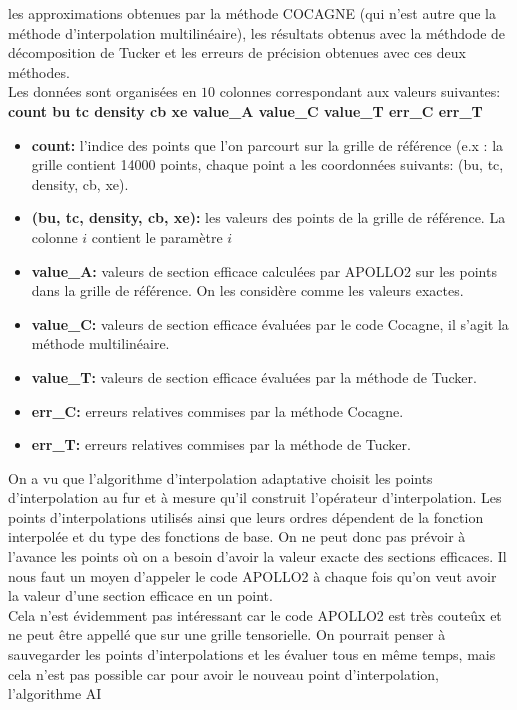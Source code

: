 les approximations obtenues par la méthode COCAGNE (qui n'est autre que la méthode d'interpolation multilinéaire), les résultats obtenus avec la méthdode de décomposition de Tucker et
les erreurs de précision obtenues avec ces deux méthodes.\\
Les données sont organisées en $10$ colonnes correspondant aux valeurs suivantes: \textbf{count bu tc density cb xe value\_A value\_C value\_T err\_C err\_T}
\begin{itemize}
\item \textbf{count:} l'indice des points que l'on parcourt sur la grille de référence (e.x : la grille contient 14000 points, chaque point a les coordonnées suivants: (bu, tc, density, cb, xe).
\item \textbf{(bu, tc, density, cb, xe):} les valeurs des points de la grille de référence. La colonne $i$ contient le paramètre $i$
\item \textbf{value\_A:} valeurs de section efficace calculées par APOLLO2 sur les points dans la grille de référence. On les considère comme les valeurs exactes.
\item \textbf{value\_C:} valeurs de section efficace évaluées par le code Cocagne, il s'agit la méthode multilinéaire.
\item \textbf{value\_T:} valeurs de section efficace évaluées par la méthode de Tucker.
\item \textbf{err\_C:} erreurs relatives commises par la méthode Cocagne.
\item \textbf{err\_T:} erreurs relatives commises par la méthode de Tucker.
\end{itemize}
\hspace{0.5cm}
On a vu que l'algorithme d'interpolation adaptative choisit les points d'interpolation au fur et à mesure qu'il construit l'opérateur d'interpolation.
Les points d'interpolations utilisés ainsi que leurs ordres dépendent de la fonction interpolée et du type des fonctions de base.
On ne peut donc pas prévoir à l'avance les points où on a besoin d'avoir la valeur exacte des sections efficaces.
Il nous faut un moyen d'appeler le code APOLLO2 à chaque fois qu'on veut avoir la valeur d'une section efficace en un point.\\
\hspace{0.5cm}
Cela n'est évidemment pas intéressant car le code APOLLO2 est très couteûx et ne peut être appellé que sur une grille tensorielle.
On pourrait penser à sauvegarder les points d'interpolations et les évaluer tous en même temps, mais cela n'est pas possible car pour avoir le nouveau point d'interpolation, l'algorithme AI
